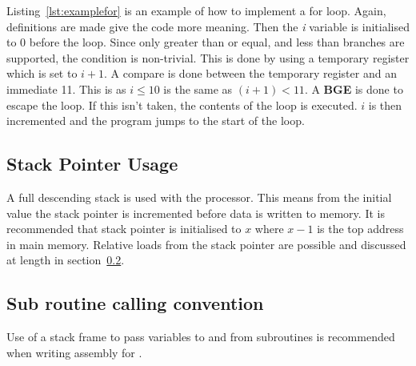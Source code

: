 

Listing~\ref{lst:examplefor} is an example of how to implement a for loop. 
Again, definitions are made give the code more meaning. 
Then the \textit{i} variable is initialised to 0 before the loop. 
Since only greater than or equal, and less than branches are supported, the condition is non-trivial.
This is done by using a temporary register which is set to $i + 1$. 
A compare is done between the temporary register and an immediate 11.
This is as $i \leq 10$ is the same as $(i+1) < 11$. 
A \textbf{BGE} is done to escape the loop. 
If this isn't taken, the contents of the loop is executed.
$i$ is then incremented and the program jumps to the start of the loop. 







\subsection{Stack Pointer Usage}


A full descending stack is used with the \samurai{} processor.
This means from the initial value the stack pointer is incremented before data is written to memory.
It is recommended that stack pointer is initialised to $x$ where $x-1$ is the top address in main memory. 
Relative loads from the stack pointer are possible and discussed at length in section~\ref{sec:subroutine_calls}.


\subsection{Sub routine calling convention}
\label{sec:subroutine_calls}

Use of a stack frame to pass variables to and from subroutines is recommended when writing assembly for \samurai{}.



